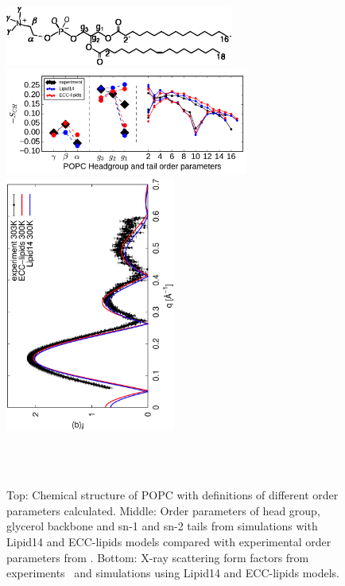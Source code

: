 \documentclass[aip,jcp,twocolumn]{revtex4}
\begin{document}
\begin{figure}[tbp]
  \centering
  \includegraphics[width=7.5cm]{../Fig/POPCstructure.eps}
  \includegraphics[width=8.0cm]{../Fig/ipython_nb/Order-parameters_exp-L14-ECCL17_q80_sig89.pdf}
  \includegraphics[height=8.4cm,angle=-90]{../Fig/form-f_exp-l14-eccl17.eps}
  \caption{\label{simVSexpNOions}
    Top: Chemical structure of POPC with definitions of different order parameters calculated.
    Middle: Order parameters of head group, glycerol backbone and sn-1 and sn-2 tails  from simulations with Lipid14 \cite{dickson14} and ECC-lipids models
    compared with experimental order parameters from \cite{ferreira13}.
    Bottom: X-ray scattering form factors from experiments~\cite{Kucerka2011} and simulations using Lipid14 \cite{dickson14} and ECC-lipids models. 
    } 
   \\
   \\
\end{figure}
\end{document}
